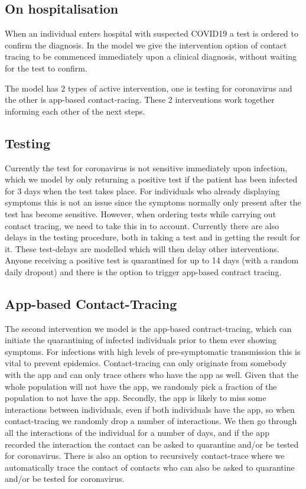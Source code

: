 \documentclass[11pt, oneside]{amsart}   	%
\begin{document}
\subsection{On hospitalisation} When an individual enters hospital with suspected COVID19 a test is ordered to confirm the diagnosis. In the model we give the intervention option of contact tracing to be commenced immediately upon a clinical diagnosis, without waiting for the test to confirm.

\medskip
The model has 2 types of active intervention, one is testing for coronavirus and the other is app-based contact-racing. 
These 2 interventions work together informing each other of the next steps.
\subsection{Testing} Currently the test for coronavirus is not sensitive immediately upon infection, which we model by only returning a positive test if the patient has been infected for 3 days when the test takes place. For individuals who already displaying symptoms this is not an issue since the symptoms normally only present after the test has become sensitive. However, when ordering tests while carrying out contact tracing, we need to take this in to account. Currently there are also delays in the testing procedure, both in taking a test and in getting the result for it. These test-delays are modelled which will then delay other interventions. Anyone receiving a positive test is quarantined for up to 14 days (with a random daily dropout) and there is the option to trigger app-based contract tracing.

\subsection{App-based Contact-Tracing} The second intervention we model is the app-based contract-tracing, which can initiate the quarantining of infected individuals prior to them ever showing symptoms. For infections with high levels of pre-symptomatic transmission this is vital to prevent epidemics. Contact-tracing can only originate from somebody with the app and can only trace others who have the app as well. Given that the whole population will not have the app, we randomly pick a fraction of the population to not have the app. Secondly, the app is likely to miss some interactions between individuals, even if both individuals have the app, so when contact-tracing we randomly drop a number of interactions. We then go through all the interactions of the individual for a number of days, and if the app recorded the interaction the contact can be asked to quarantine and/or be tested for coronavirus. There is also an option to recursively contact-trace where we automatically trace the contact of contacts who can also be asked to quarantine and/or be tested for coronavirus.
\end{document}
